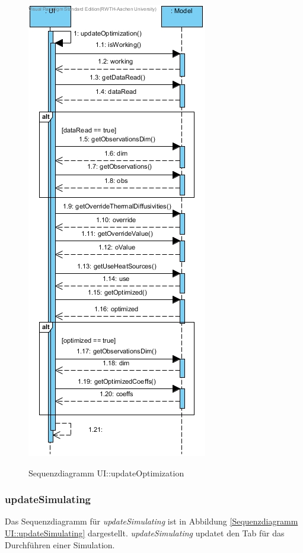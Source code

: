 \begin{figure}[H]
	\centering
	\includegraphics[scale=.75]{Bilder/UI__updateOptimization().jpg}\\
	\caption{Sequenzdiagramm UI::updateOptimization}
	\label{Sequenzdiagramm UI::updateOptimization}
\end{figure}

\subsubsection*{updateSimulating}

Das Sequenzdiagramm für \emph{updateSimulating} ist in Abbildung \ref{Sequenzdiagramm UI::updateSimulating} dargestellt. \emph{updateSimulating} updatet den Tab für das Durchführen einer Simulation.

